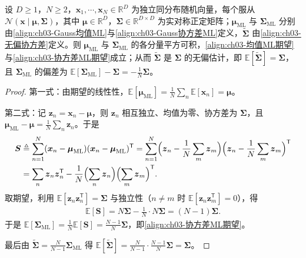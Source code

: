 \documentclass[../../main.tex]{subfiles}
\begin{document}
\begin{proposition}[最大似然估计量的期望与无偏修正]\label{proposition:ch03-GaussML期望}
设 $D\geqslant1$，$N\geqslant2$，$\boldsymbol{x}_1,\cdots,\boldsymbol{x}_N\in\mathbb{R}^{D}$ 为独立同分布随机向量，每个服从 $\mathcal{N}(\boldsymbol{x}\mid\boldsymbol{\mu},\boldsymbol{\Sigma})$，其中 $\boldsymbol{\mu}\in\mathbb{R}^{D}$，$\boldsymbol{\Sigma}\in\mathbb{R}^{D\times D}$ 为实对称正定矩阵；$\boldsymbol{\mu}_{\mathrm{ML}}$ 与 $\boldsymbol{\Sigma}_{\mathrm{ML}}$ 分别由\eqref{align:ch03-Gauss均值ML}与\eqref{align:ch03-Gauss协方差ML}定义，$\tilde{\boldsymbol{\Sigma}}$ 由\eqref{align:ch03-无偏协方差}定义。则 $\boldsymbol{\mu}_{\mathrm{ML}}$ 与 $\boldsymbol{\Sigma}_{\mathrm{ML}}$ 的各分量平方可积，\eqref{align:ch03-均值ML期望}与\eqref{align:ch03-协方差ML期望}成立；从而 $\tilde{\boldsymbol{\Sigma}}$ 是 $\boldsymbol{\Sigma}$ 的无偏估计，即 $\mathbb{E}[\tilde{\boldsymbol{\Sigma}}]=\boldsymbol{\Sigma}$，且 $\boldsymbol{\Sigma}_{\mathrm{ML}}$ 的偏差为 $\mathbb{E}[\boldsymbol{\Sigma}_{\mathrm{ML}}]-\boldsymbol{\Sigma}=-\frac{1}{N}\boldsymbol{\Sigma}$。
\end{proposition}
\begin{proof}
第一式：由期望的线性性，$\mathbb{E}[\boldsymbol{\mu}_{\mathrm{ML}}]=\frac{1}{N}\sum_n\mathbb{E}[\boldsymbol{x}_n]=\boldsymbol{\mu}$。

第二式：记 $\boldsymbol{z}_n=\boldsymbol{x}_n-\boldsymbol{\mu}$，则 $\boldsymbol{z}_n$ 相互独立、均值为零、协方差为 $\boldsymbol{\Sigma}$，且 $\boldsymbol{\mu}_{\mathrm{ML}}-\boldsymbol{\mu}=\frac{1}{N}\sum_n\boldsymbol{z}_n$。于是
\begin{align*}
\boldsymbol{S}&\triangleq\sum_{n=1}^{N}(\boldsymbol{x}_n-\boldsymbol{\mu}_{\mathrm{ML}})(\boldsymbol{x}_n-\boldsymbol{\mu}_{\mathrm{ML}})^{\mathsf{T}}=\sum_{n=1}^{N}\Bigl(\boldsymbol{z}_n-\frac{1}{N}\sum_{m}\boldsymbol{z}_m\Bigr)\Bigl(\boldsymbol{z}_n-\frac{1}{N}\sum_{m}\boldsymbol{z}_m\Bigr)^{\mathsf{T}}\\
&=\sum_{n}\boldsymbol{z}_n\boldsymbol{z}_n^{\mathsf{T}}-\frac{1}{N}\Bigl(\sum_{n}\boldsymbol{z}_n\Bigr)\Bigl(\sum_{m}\boldsymbol{z}_m\Bigr)^{\mathsf{T}}.
\end{align*}
取期望，利用 $\mathbb{E}[\boldsymbol{z}_n\boldsymbol{z}_n^{\mathsf{T}}]=\boldsymbol{\Sigma}$ 与独立性（$n\neq m$ 时 $\mathbb{E}[\boldsymbol{z}_n\boldsymbol{z}_m^{\mathsf{T}}]=0$），得
\begin{align*}
\mathbb{E}[\boldsymbol{S}]=N\boldsymbol{\Sigma}-\frac{1}{N}\cdot N\boldsymbol{\Sigma}=(N-1)\boldsymbol{\Sigma}.
\end{align*}
于是 $\mathbb{E}[\boldsymbol{\Sigma}_{\mathrm{ML}}]=\frac{1}{N}\mathbb{E}[\boldsymbol{S}]=\frac{N-1}{N}\boldsymbol{\Sigma}$，即\eqref{align:ch03-协方差ML期望}。

最后由 $\tilde{\boldsymbol{\Sigma}}=\frac{N}{N-1}\boldsymbol{\Sigma}_{\mathrm{ML}}$ 得 $\mathbb{E}[\tilde{\boldsymbol{\Sigma}}]=\frac{N}{N-1}\cdot\frac{N-1}{N}\boldsymbol{\Sigma}=\boldsymbol{\Sigma}$。
\end{proof}
\end{document}
